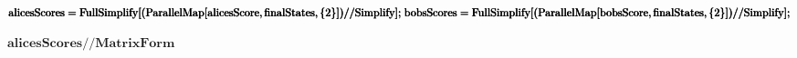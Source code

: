 \documentclass{article}
\begin{document}
\begin{doublespace}
\noindent\(\pmb{\text{alicesScores} = }\\
\pmb{\text{FullSimplify}[(\text{ParallelMap}[\text{alicesScore},\text{finalStates},\{2\}])\text{//}}\\
\pmb{\text{Simplify}];}\\
\pmb{\text{bobsScores} = }\\
\pmb{\text{FullSimplify}[(\text{ParallelMap}[\text{bobsScore},\text{finalStates},\{2\}])\text{//}}\\
\pmb{\text{Simplify}];}\)
\end{doublespace}

\begin{doublespace}
\noindent\(\pmb{\text{alicesScores}\text{//}\text{MatrixForm}}\)
\end{doublespace}
\end{document}
